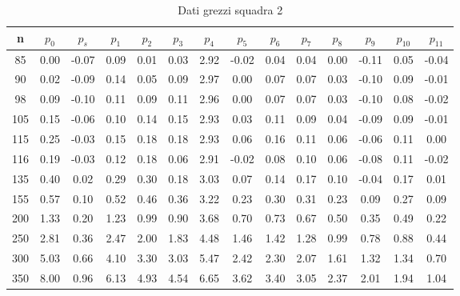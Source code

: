 \begin{table}[H]
    \centering
    \begin{tabular}{|c|c|c|c|c|c|c|c|c|c|c|c|c|c|}
    \hline
    n   & $p_0$ & $p_s$ & $p_1$ & $p_2$ & $p_3$ & $p_4$ & $p_5$ & $p_6$ & $p_7$ & $p_8$ & $p_9$ & $p_{10}$ & $p_{11}$ \\ \hline
    85  & 0.00  & -0.07 & 0.09  & 0.01  & 0.03  & 2.92  & -0.02 & 0.04  & 0.04  & 0.00  & -0.11 & 0.05     & -0.04    \\ \hline
    90  & 0.02  & -0.09 & 0.14  & 0.05  & 0.09  & 2.97  & 0.00  & 0.07  & 0.07  & 0.03  & -0.10 & 0.09     & -0.01    \\ \hline
    98  & 0.09  & -0.10 & 0.11  & 0.09  & 0.11  & 2.96  & 0.00  & 0.07  & 0.07  & 0.03  & -0.10 & 0.08     & -0.02    \\ \hline
    105 & 0.15  & -0.06 & 0.10  & 0.14  & 0.15  & 2.93  & 0.03  & 0.11  & 0.09  & 0.04  & -0.09 & 0.09     & -0.01    \\ \hline
    115 & 0.25  & -0.03 & 0.15  & 0.18  & 0.18  & 2.93  & 0.06  & 0.16  & 0.11  & 0.06  & -0.06 & 0.11     & 0.00     \\ \hline
    116 & 0.19  & -0.03 & 0.12  & 0.18  & 0.06  & 2.91  & -0.02 & 0.08  & 0.10  & 0.06  & -0.08 & 0.11     & -0.02    \\ \hline
    135 & 0.40  & 0.02  & 0.29  & 0.30  & 0.18  & 3.03  & 0.07  & 0.14  & 0.17  & 0.10  & -0.04 & 0.17     & 0.01     \\ \hline
    155 & 0.57  & 0.10  & 0.52  & 0.46  & 0.36  & 3.22  & 0.23  & 0.30  & 0.31  & 0.23  & 0.09  & 0.27     & 0.09     \\ \hline
    200 & 1.33  & 0.20  & 1.23  & 0.99  & 0.90  & 3.68  & 0.70  & 0.73  & 0.67  & 0.50  & 0.35  & 0.49     & 0.22     \\ \hline
    250 & 2.81  & 0.36  & 2.47  & 2.00  & 1.83  & 4.48  & 1.46  & 1.42  & 1.28  & 0.99  & 0.78  & 0.88     & 0.44     \\ \hline
    300 & 5.03  & 0.66  & 4.10  & 3.30  & 3.03  & 5.47  & 2.42  & 2.30  & 2.07  & 1.61  & 1.32  & 1.34     & 0.70     \\ \hline
    350 & 8.00  & 0.96  & 6.13  & 4.93  & 4.54  & 6.65  & 3.62  & 3.40  & 3.05  & 2.37  & 2.01  & 1.94     & 1.04     \\ \hline
    \end{tabular}
    \caption{Dati grezzi squadra 2}
\end{table}

